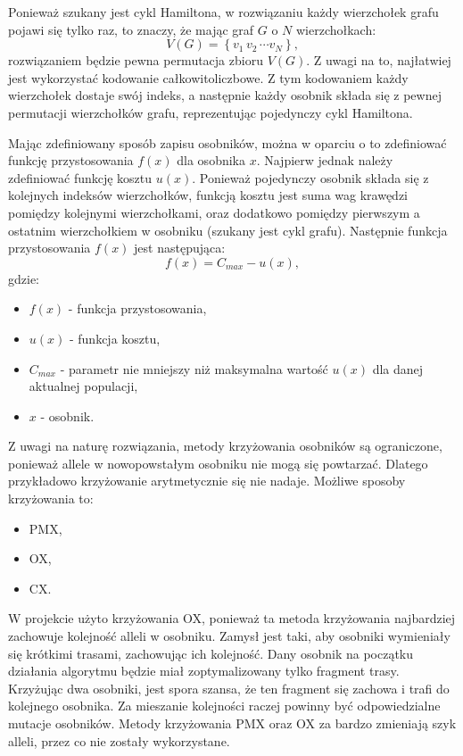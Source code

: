 \documentclass{article}
\begin{document}
Ponieważ szukany jest cykl Hamiltona, w rozwiązaniu
każdy wierzchołek grafu pojawi się tylko raz, to znaczy, że mając graf $G$ o $N$
wierzchołkach:
\begin{equation}
    V\left(G\right) = \left\{ v_1 \, v_2 \, \cdots v_N \right\},
\end{equation}
rozwiązaniem będzie pewna permutacja zbioru $V\left(G\right)$. Z uwagi na to,
najłatwiej jest wykorzystać kodowanie całkowitoliczbowe. Z tym kodowaniem każdy
wierzchołek dostaje swój indeks, a następnie każdy osobnik składa się z pewnej
permutacji wierzchołków grafu, reprezentując pojedynczy cykl Hamiltona.

Mając zdefiniowany sposób zapisu osobników, można w oparciu o to zdefiniować
funkcję przystosowania $f \left( x \right)$ dla osobnika $x$. Najpierw jednak
należy zdefiniować funkcję kosztu $u \left( x \right)$. Ponieważ pojedynczy
osobnik składa się z kolejnych indeksów wierzchołków, funkcją kosztu jest
suma wag krawędzi pomiędzy kolejnymi wierzchołkami, oraz dodatkowo pomiędzy
pierwszym a ostatnim wierzchołkiem w osobniku (szukany jest cykl grafu).
Następnie funkcja przystosowania $f \left( x \right)$ jest następująca:
\begin{equation}
    f \left( x \right) = C_{max} - u \left( x \right),
\end{equation}
gdzie:
\begin{itemize}
    \item[] $f \left( x \right)$ - funkcja przystosowania,
    \item[] $u \left( x \right)$ - funkcja kosztu,
    \item[] $C_{max}$ - parametr nie mniejszy niż maksymalna wartość
            $u \left( x \right)$ dla danej aktualnej populacji,
    \item[] $x$ - osobnik.
\end{itemize}

Z uwagi na naturę rozwiązania, metody krzyżowania osobników są ograniczone,
ponieważ allele w nowopowstałym osobniku nie mogą się powtarzać. Dlatego
przykładowo krzyżowanie arytmetycznie się nie nadaje. Możliwe sposoby
krzyżowania to:
\begin{itemize}
    \item PMX,
    \item OX,
    \item CX.
\end{itemize}
W projekcie użyto krzyżowania OX, ponieważ ta metoda krzyżowania najbardziej
zachowuje kolejność alleli w osobniku. Zamysł jest taki, aby osobniki wymieniały
się krótkimi trasami, zachowując ich kolejność. Dany osobnik na początku
działania algorytmu będzie miał zoptymalizowany tylko fragment trasy. Krzyżując
dwa osobniki, jest spora szansa, że ten fragment się zachowa i trafi do
kolejnego osobnika. Za mieszanie kolejności raczej powinny być odpowiedzialne
mutacje osobników. Metody krzyżowania PMX oraz OX za bardzo zmieniają szyk
alleli, przez co nie zostały wykorzystane.
\end{document}

